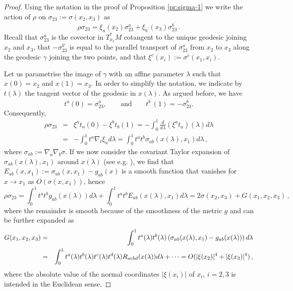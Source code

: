 \documentclass[a4paper,10pt,twoside]{article}
\numberwithin{equation}{section}
\newcounter{and}
\theoremstyle{plain}
\theoremstyle{definition}
\begin{document}
\begin{proof}Using the notation in the proof of Proposition \ref{pr:sigma-1} we write the action of $\rho$ on $\sigma_{23}:=\sigma(x_2,x_3)$ as
\[
\rho \sigma_{23}  =    \xi_a(x_2) \sigma^a_{23} + \xi_{b^\prime}(x_3)\sigma^{b^\prime}_{23}\,.
\]
Recall that $\sigma_{23}^a$ is the covector in $T^*_{x_2}M$ cotangent to the unique geodesic joining $x_2$ and $x_3$, that $-\sigma^{b'}_{23}$ is equal to the parallel transport of $\sigma^a_{23}$ from $x_2$ to $x_3$ along the geodesic $\gamma$ joining the two points, and that $\xi^c(x_i):=\sigma^c(x_1,x_i)$.


Let us parametrise the image of $\gamma$ with an affine parameter $\lambda$ such that $x(0) = x_2$ and $x(1) = x_3$. In order to simplify the notation, we indicate by $t(\lambda)$ the tangent vector of the geodesic in $x(\lambda)$. As argued before, we have
\[
t^a(0)=\sigma^a_{23},\qquad \text{and}\qquad t^{b^\prime}(1)=-\sigma^{b^\prime}_{23}.
\]   
Consequently,
\begin{eqnarray*}
\rho \sigma_{23}
&=& \xi^a t_a (0) - \xi^b t_b(1) 
= - \int_{0}^{1} \frac{d}{d\lambda} (\xi^a t_a)(\lambda) d\lambda \\
&=& - \int_{0}^{1} t^a \nabla_t  \xi_a   d\lambda  
= \int_{0}^{1} t^a t^b \sigma_{ab}(x(\lambda),x_1) d\lambda\,,
\end{eqnarray*}
where $\sigma_{ab} := \nabla_a\nabla_b \sigma$. If we now consider the covariant Taylor expansion of $\sigma_{ab}(x(\lambda),x_1)$ around $x(\lambda)$ (see e.g. \cite{Poisson:2011nh}), we find that $E_{ab}(x,x_1):=\sigma_{ab}(x,x_1) - g_{ab}(x) $ is a smooth function that vanishes for $x\to x_1$ as $O(\sigma(x,x_1))$, hence
\[
\rho\sigma_{23}  = \int_{0}^{1} t^a t^b g_{ab}(x(\lambda))    d\lambda +  \int_{0}^{1} t^a t^b E_{ab}(x(\lambda),x_1)    d\lambda  = 2\sigma(x_2,x_3) + G(x_1,x_2,x_3)\,,
\]
where the remainder is smooth because of the smoothness of the metric $g$ and can be further expanded as 
\begin{eqnarray}\label{eq:remainder-sigma}
G(x_1,x_2,x_3) &=& \int_{0}^{1} t^a(\lambda) t^b(\lambda) \left(\sigma_{ab}(x(\lambda),x_1) - g_{ab}(x(\lambda))\right) d\lambda\\ &=&  
\int_{0}^{1} t^a(\lambda) t^b(\lambda) t^c(\lambda) t^d(\lambda) R_{acbd}(x(\lambda))d\lambda + \dots = O(|\xi(x_2)|^4+|\xi(x_3)|^4)\,,\notag
\end{eqnarray}
where the absolute value of the normal coordinates $|\xi(x_i)|$ of $x_i$, $i=2,3$ is intended in the Euclidean sense.
\end{proof}
\end{document}
